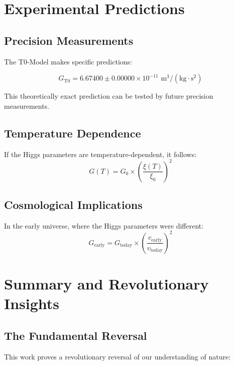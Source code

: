 \documentclass[12pt,a4paper]{article}
\begin{document}
	\section{Experimental Predictions}
	
	\subsection{Precision Measurements}
	
	The T0-Model makes specific predictions:
	
	\begin{equation}
		G_{\text{T0}} = 6.67400 \pm 0.00000 \times 10^{-11} \text{ m}^3/(\text{kg} \cdot \text{s}^2)
	\end{equation}
	
	This theoretically exact prediction can be tested by future precision measurements.
	
	\subsection{Temperature Dependence}
	
	If the Higgs parameters are temperature-dependent, it follows:
	\begin{equation}
		G(T) = G_0 \times \left(\frac{\xi(T)}{\xi_0}\right)^2
	\end{equation}
	
	\subsection{Cosmological Implications}
	
	In the early universe, where the Higgs parameters were different:
	\begin{equation}
		G_{\text{early}} = G_{\text{today}} \times \left(\frac{v_{\text{early}}}{v_{\text{today}}}\right)^2
	\end{equation}
	
	\section{Summary and Revolutionary Insights}
	
	\subsection{The Fundamental Reversal}
	
	This work proves a revolutionary reversal of our understanding of nature:
	
\end{document}
